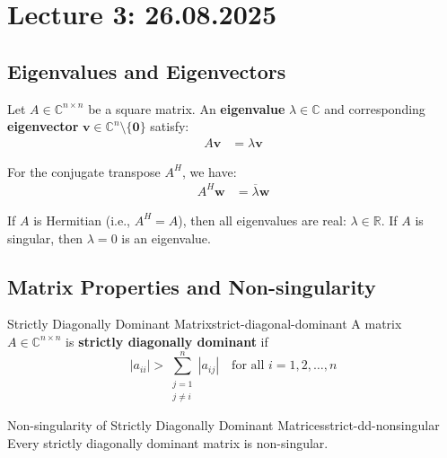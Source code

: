 \section{Lecture 3: 26.08.2025}

\subsection{Eigenvalues and Eigenvectors}

Let $A \in \mathbb{C}^{n \times n}$ be a square matrix. An \textbf{eigenvalue} $\lambda \in \mathbb{C}$ and corresponding \textbf{eigenvector} $\mathbf{v} \in \mathbb{C}^n \setminus \{\mathbf{0}\}$ satisfy:
\begin{align}
    A \mathbf{v} & = \lambda \mathbf{v} \label{eq:eigenvalue-equation}
\end{align}

For the conjugate transpose $A^H$, we have:
\begin{align}
    A^H \mathbf{w} & = \overline{\lambda} \mathbf{w} \label{eq:conjugate-eigenvalue}
\end{align}

\begin{remark}{}{}
    If $A$ is Hermitian (i.e., $A^H = A$), then all eigenvalues are real: $\lambda \in \mathbb{R}$.
    If $A$ is singular, then $\lambda = 0$ is an eigenvalue.
\end{remark}

\subsection{Matrix Properties and Non-singularity}

\begin{definition}{Strictly Diagonally Dominant Matrix}{strict-diagonal-dominant}
    A matrix $A \in \mathbb{C}^{n \times n}$ is \textbf{strictly diagonally dominant} if
    \begin{equation}
        |a_{ii}| > \sum_{\substack{j=1 \\ j \neq i}}^n |a_{ij}| \quad \text{for all } i = 1, 2, \ldots, n
    \end{equation}
\end{definition}

\begin{theorem}{Non-singularity of Strictly Diagonally Dominant Matrices}{strict-dd-nonsingular}
    Every strictly diagonally dominant matrix is non-singular.
\end{theorem}

